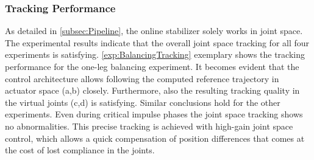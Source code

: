 \subsubsection{Tracking Performance}
As detailed in \cref{subsec:Pipeline}, the online stabilizer solely works in joint space. The experimental results indicate that the overall joint space tracking for all four experiments is satisfying. 
\cref{exp:BalancingTracking} exemplary shows the tracking performance for the one-leg balancing experiment. It becomes evident that the control architecture allows following the computed reference trajectory in actuator space (a,b) closely. Furthermore, also the resulting tracking quality in the virtual joints (c,d) is satisfying. Similar conclusions hold for the other experiments. Even during critical impulse phases the joint space tracking shows no abnormalities. This precise tracking is achieved with high-gain joint space control, which allows a quick compensation of position differences that comes at the cost of lost compliance in the joints.
